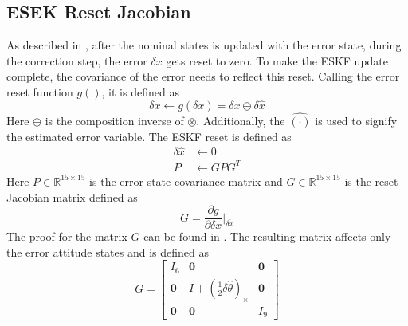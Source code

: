\subsection{ESEK Reset Jacobian}
As described in \cite{Quaternion_Kinematics_for_the_Error-state_EKF}, after the nominal states is updated with the error state, during the correction step, the error $\delta x$ gets reset to zero. To make the ESKF update complete, the covariance of the error needs to reflect this reset. Calling the error reset function $g()$, it is defined as \cite{Quaternion_Kinematics_for_the_Error-state_EKF}
\begin{equation}
    \delta x \leftarrow g(\delta x) = \delta x \ominus \delta \hat{x}
    \label{eq: g() reset fnc}
\end{equation}
Here $\ominus$ is the composition inverse of $\otimes$. Additionally, the $\hat{(\cdot)}$ is used to signify the estimated error variable. The ESKF reset is defined as \cite{Quaternion_Kinematics_for_the_Error-state_EKF}
\begin{subequations}
    \begin{align}
        \delta \hat{x} &\leftarrow 0\\
        P &\leftarrow G P G^T
        \label{eq: error reset operation}
    \end{align}
\end{subequations}
Here $P \in \mathbb{R}^{15 \times 15}$ is the error state covariance matrix and $G \in \mathbb{R}^{15 \times 15}$ is the reset Jacobian matrix defined as
\begin{equation}
    G = \frac{\partial g}{\partial \delta x}\bigg|_{\bar{\delta x}}
    \label{eq: G partial}
\end{equation}
The proof for the matrix $G$ can be found in \cite{Quaternion_Kinematics_for_the_Error-state_EKF}. The resulting matrix affects only the error attitude states and is defined as
\begin{equation}
    G = \begin{bmatrix}
        I_6 & \mathbf{0} & \mathbf{0}\\
        \mathbf{0} & I + (\frac{1}{2} \delta \hat{\theta})_{\times} & \mathbf{0}\\
        \mathbf{0} & \mathbf{0} & I_9
    \end{bmatrix}
    \label{eq: Full G matrix}
\end{equation}



